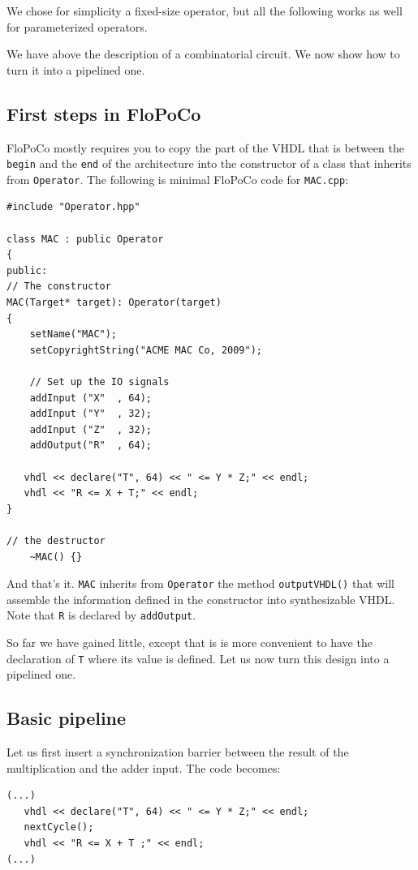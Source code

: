 \documentclass{article}
\begin{document}
We chose for simplicity a fixed-size operator, but all the following
works as well for parameterized operators.

We have above the description of a combinatorial circuit. We now show how to
turn it into a pipelined one.


\subsection{First steps in FloPoCo}

FloPoCo mostly requires you to copy the part of the VHDL that is
between the \texttt{begin} and the \texttt{end} of the architecture
into the constructor of a class that inherits from
\verb!Operator!. The following is minimal FloPoCo code for
\verb!MAC.cpp!:
\begin{verbatim}
#include "Operator.hpp"

class MAC : public Operator
{
public:
// The constructor
MAC(Target* target): Operator(target)
{
	setName("MAC");
	setCopyrightString("ACME MAC Co, 2009");		

	// Set up the IO signals
	addInput ("X"  , 64);
	addInput ("Y"  , 32);
	addInput ("Z"  , 32);
	addOutput("R"  , 64);

   vhdl << declare("T", 64) << " <= Y * Z;" << endl;
   vhdl << "R <= X + T;" << endl;
}

// the destructor
	~MAC() {}
\end{verbatim}
 
And that's it. \verb!MAC! inherits from \verb!Operator! the method
\verb!outputVHDL()! that will assemble the information defined in the
constructor into synthesizable VHDL. Note that \verb!R! is declared by \verb!addOutput!.

So far we have gained little, except that is is more convenient to
have the declaration of \verb!T! where its value is defined. Let us
now turn this design into a pipelined one.


\subsection{Basic pipeline}

Let us first insert a synchronization barrier between the result of the
multiplication and the adder input. The code becomes: 

\begin{verbatim}
(...)
   vhdl << declare("T", 64) << " <= Y * Z;" << endl;
   nextCycle();
   vhdl << "R <= X + T ;" << endl;
(...)
\end{verbatim}
\end{document}
